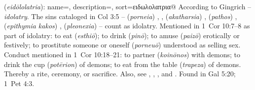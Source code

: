 \item[Idolatry,]

(\textit{eidōlolatria}):
{
    name=,
    description={},
    sort=ειδωλολατρια@
}
According to Gingrich -- \emph{idolatry}. The sins cataloged in Col 3:5 --  (\emph{porneia}) , , (\emph{akatharsia}) ,  (\emph{pathos}) ,  (\emph{epithymia kakos}) ,  (\emph{pleonexia})  -- count as idolatry. Mentioned in 1~Cor 10:7--8 as part of idolatry: to eat  (\emph{esthiō}); to drink  (\emph{pinō}); to amuse  (\emph{paizō}) erotically or festively; to prostitute someone or oneself  (\emph{porneuō}) understood as selling sex. Conduct mentioned in 1~Cor 10:18--21: to partner  (\emph{koinōnos}) with demons; to drink the cup  (\emph{potērion}) of demons; to eat from the table  (\emph{trapeza}) of demons. Thereby a rite, ceremony, or sacrifice. Also, see  , , , and .
Found in Gal 5:20; 1~Pet 4:3.
